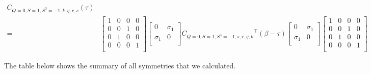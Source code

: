 \begin{equation}
  \begin{aligned}
    C_{Q=0,S=1,S^3=-1;k,q,r,s} (\tau) \\
    =& \left[ {\begin{array}{cccc}
      1 & 0 & 0 & 0 \\
      0 & 0 & 1 & 0 \\
      0 & 1 & 0 & 0 \\
      0 & 0 & 0 & 1 \\
    \end{array} } \right]
    \left[ {\begin{array}{cc}
      0 & \sigma_1 \\
      \sigma_1 & 0 \\
    \end{array} } \right]
    {C_{Q=0,S=1,S^3=-1;s,r,q,k}}^\top (\beta-\tau)
    \left[ {\begin{array}{cc}
      0 & \sigma_1 \\
      \sigma_1 & 0 \\
    \end{array} } \right]
    \left[ {\begin{array}{cccc}
      1 & 0 & 0 & 0 \\
      0 & 0 & 1 & 0 \\
      0 & 1 & 0 & 0 \\
      0 & 0 & 0 & 1 \\
    \end{array} } \right]
  \end{aligned}
\end{equation}

The table below shows the summary of all symmetries that we calculated.

